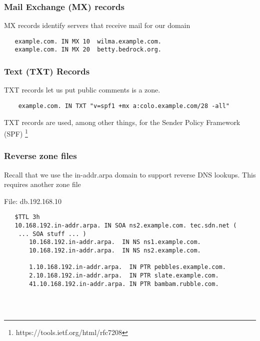 \documentclass[10pt]{beamer}
\begin{document}
\begin{frame}[fragile]
  \frametitle{Mail Exchange (MX) records}
 MX records identify servers that receive mail for our domain
 \begin{verbatim}
   example.com. IN MX 10  wilma.example.com.  
   example.com. IN MX 20  betty.bedrock.org.
 \end{verbatim}

\end{frame}

\begin{frame}[fragile]
	\frametitle{Text (TXT) Records}
	
	TXT records let us put public comments is a zone.
	\begin{verbatim}
	example.com. IN TXT "v=spf1 +mx a:colo.example.com/28 -all"
	\end{verbatim}
	TXT records are used, among other things, for the Sender Policy Framework (SPF) \footnote{ https://tools.ietf.org/html/rfc7208}
\end{frame}


\begin{frame}[fragile]
  \frametitle{Reverse zone files}

 Recall that we use the in-addr.arpa domain to support reverse DNS 
 lookups.  This requires another zone file
 
 File: db.192.168.10
 \begin{verbatim}
   $TTL 3h
   10.168.192.in-addr.arpa. IN SOA ns2.example.com. tec.sdn.net (
    ... SOA stuff ... )
       10.168.192.in-addr.arpa.  IN NS ns1.example.com.
       10.168.192.in-addr.arpa.  IN NS ns2.example.com.

       1.10.168.192.in-addr.arpa.  IN PTR pebbles.example.com.
       2.10.168.192.in-addr.arpa.  IN PTR slate.example.com.
       41.10.168.192.in-addr.arpa. IN PTR bambam.rubble.com.


   
 \end{verbatim}

\end{frame}
\end{document}
